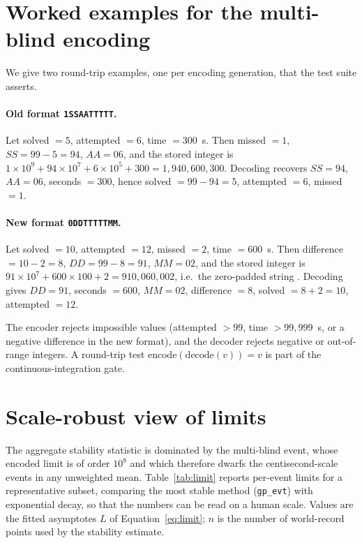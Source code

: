 \section{Worked examples for the multi-blind encoding}
\label{app:multi}

We give two round-trip examples, one per encoding generation, that the test
suite asserts.

\paragraph{Old format \texttt{1SSAATTTTT}.} Let solved $=5$, attempted $=6$,
time $=300$~s. Then missed $=1$, $SS = 99-5 = 94$, $AA = 06$, and the stored
integer is
$1\!\times\!10^{9} + 94\!\times\!10^{7} + 6\!\times\!10^{5} + 300
= 1{,}940{,}600{,}300$.
Decoding recovers $SS=94$, $AA=06$, seconds $=300$, hence solved $=99-94=5$,
attempted $=6$, missed $=1$.

\paragraph{New format \texttt{0DDTTTTTMM}.} Let solved $=10$, attempted $=12$,
missed $=2$, time $=600$~s. Then difference $=10-2=8$, $DD = 99-8 = 91$,
$MM = 02$, and the stored integer is
$91\!\times\!10^{7} + 600\!\times\!100 + 2 = 910{,}060{,}002$, i.e.\ the
zero-padded string . Decoding gives $DD=91$, seconds $=600$,
$MM=02$, difference $=8$, solved $=8+2=10$, attempted $=12$.

The encoder rejects impossible values (attempted $>99$, time $>99{,}999$~s,
or a negative difference in the new format), and the decoder rejects negative
or out-of-range integers. A round-trip test
$\mathrm{encode}(\mathrm{decode}(v)) = v$ is part of the continuous-integration
gate.

\section{Scale-robust view of  limits}
\label{app:limit}

The aggregate  stability statistic is dominated by the multi-blind
event, whose encoded limit is of order $10^{8}$ and which therefore dwarfs the
centisecond-scale events in any unweighted mean. Table~\ref{tab:limit} reports
per-event limits for a representative subset, comparing the most stable method
(\texttt{gp\_evt}) with exponential decay, so that the numbers can be read on a
human scale. Values are the fitted asymptotes $L$ of Equation~\ref{eq:limit};
$n$ is the number of world-record points used by the stability estimate.

